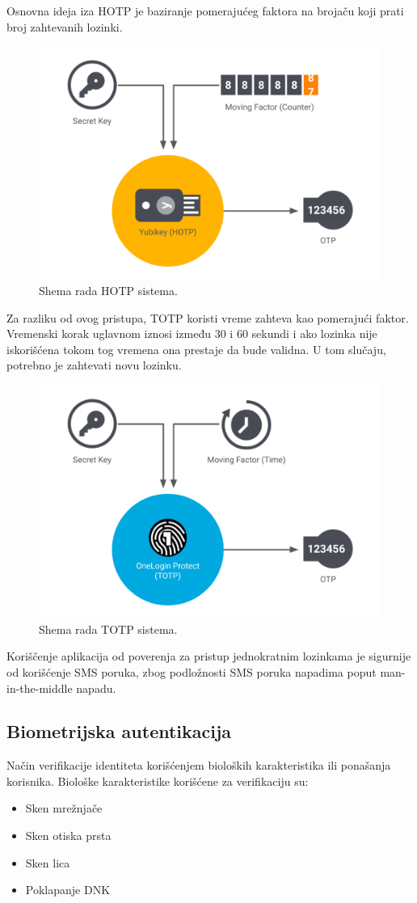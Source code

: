 \documentclass[fleqn, 12pt]{article}
\begin{document}
Osnovna ideja iza HOTP je baziranje pomerajućeg faktora na brojaču koji prati broj zahtevanih lozinki. 

\begin{figure}[H]
    \centering
    \includegraphics[width=0.5\linewidth]{HOTP.png}
    \caption{Shema rada HOTP sistema.\cite{OTP}}
    \label{fig:enter-label}
\end{figure}

Za razliku od ovog pristupa, TOTP koristi vreme zahteva kao pomerajući faktor. Vremenski korak uglavnom iznosi između 30 i 60 sekundi i ako lozinka nije iskorišćena tokom tog vremena ona prestaje da bude validna. U tom slučaju, potrebno je zahtevati novu lozinku. 

\begin{figure}[H]
    \centering
    \includegraphics[width=0.5\linewidth]{TOTP.png}
    \caption{Shema rada TOTP sistema.\cite{OTP}}
    \label{fig:enter-label}
\end{figure}

Koriščenje aplikacija od poverenja za pristup jednokratnim lozinkama je sigurnije od korišćenje SMS poruka, zbog podložnosti SMS poruka napadima poput man-in-the-middle napadu.

\newpage
\subsection{Biometrijska autentikacija}
\indent Način verifikacije identiteta korišćenjem bioloških karakteristika ili ponašanja korisnika. Biološke karakteristike korišćene za verifikaciju su:
\begin{itemize}
    \item Sken mrežnjače
    \item Sken otiska prsta
    \item Sken lica
    \item Poklapanje DNK 
\end{itemize}
\end{document}
